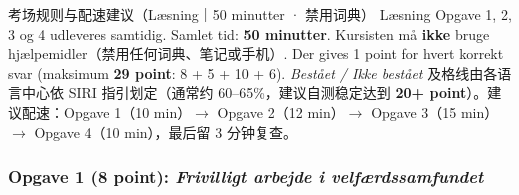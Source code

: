 

\begin{tipbox}{考场规则与配速建议（Læsning｜50 minutter · 禁用词典）}
\small
Læsning Opgave 1, 2, 3 og 4 udleveres samtidig. Samlet tid: \textbf{50 minutter}. Kursisten må \textbf{ikke} bruge hjælpemidler（禁用任何词典、笔记或手机）. Der gives 1 point for hvert korrekt svar (maksimum \textbf{29 point}: 8 + 5 + 10 + 6). \textit{Bestået / Ikke bestået} 及格线由各语言中心依 SIRI 指引划定（通常约 60--65\%，建议自测稳定达到 \textbf{20+ point}）。建议配速：Opgave 1（10 min）$\rightarrow$ Opgave 2（12 min）$\rightarrow$ Opgave 3（15 min）$\rightarrow$ Opgave 4（10 min），最后留 3 分钟复查。
\end{tipbox}

\subsubsection*{Opgave 1 (8 point): \textit{Frivilligt arbejde i velfærdssamfundet}}

